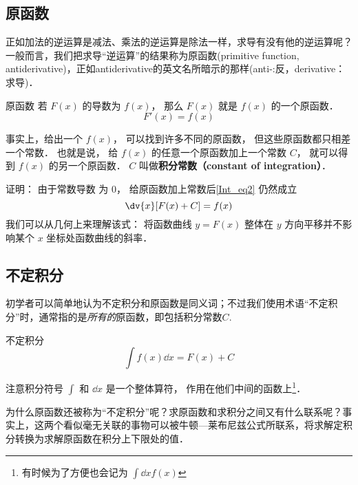 
\subsection{原函数}
正如加法的逆运算是减法、乘法的逆运算是除法一样，求导有没有他的逆运算呢？一般而言，我们把求导“逆运算”的结果称为原函数(primitive function, antiderivative)，正如antiderivative的英文名所暗示的那样(anti-:反，derivative：求导)．

\begin{definition}{原函数}
若 $F(x)$ 的导数为 $f(x)$， 那么 $F(x)$ 就是  $f(x)$ 的一个原函数．
\begin{equation}\label{Int_eq2}
F'(x) = f(x)
\end{equation}
\end{definition}

\begin{theorem}{}
事实上，给出一个 $f(x)$， 可以找到许多不同的原函数， 但这些原函数都只相差一个常数． 也就是说， 给 $f(x)$ 的任意一个原函数加上一个常数 $C$， 就可以得到 $f(x)$ 的另一个原函数． $C$ 叫做\textbf{积分常数（constant of integration）}．
\end{theorem}

证明： 由于常数导数%
为 $0$， 给原函数加上常数后\autoref{Int_eq2} 仍然成立
\begin{equation}\label{Int_eq3}
\dv{x} [F(x) + C] = f(x)
\end{equation}
我们可以从几何上来理解该式： 将函数曲线 $y = F(x)$ 整体在 $y$ 方向平移并不影响某个 $x$ 坐标处函数曲线的斜率．

\subsection{不定积分}
初学者可以简单地认为不定积分和原函数是同义词；不过我们使用术语“不定积分”时，通常指的是\textsl{所有的}原函数，即包括积分常数$C$.

\begin{definition}{不定积分}
\begin{equation}\label{Int_eq1}
\int f(x) \dd{x} = F(x) + C
\end{equation}
\end{definition}
注意积分符号 $\int$ 和 $\dd{x}$ 是一个整体算符， 作用在他们中间的函数上\footnote{有时候为了方便也会记为 $\int\dd{x} f(x)$}．

为什么原函数还被称为“不定积分”呢？求原函数和求积分之间又有什么联系呢？事实上，这两个看似毫无关联的事物可以被牛顿—莱布尼兹公式所联系，将求解定积分转换为求解原函数在积分上下限处的值．

